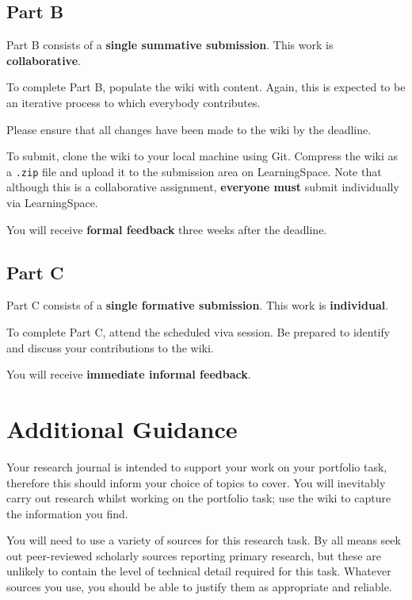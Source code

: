 \documentclass{../../fal_assignment}
\begin{document}
\subsection*{Part B}

Part B consists of a \textbf{single summative submission}. This work is \textbf{collaborative}.

To complete Part B, populate the wiki with content.
Again, this is expected to be an iterative process to which everybody contributes.

Please ensure that all changes have been made to the wiki by the deadline.

To submit, clone the wiki to your local machine using Git.
Compress the wiki as a \texttt{.zip} file and upload it to the submission area on LearningSpace.
Note that although this is a collaborative assignment,
\textbf{everyone must} submit individually via LearningSpace.

You will receive \textbf{formal feedback} three weeks after the deadline.

\subsection*{Part C}

Part C consists of a \textbf{single formative submission}. This work is \textbf{individual}.

To complete Part C, attend the scheduled viva session.
Be prepared to identify and discuss your contributions to the wiki.

You will receive \textbf{immediate informal feedback}.

\section*{Additional Guidance}

Your research journal is intended to support your work on your portfolio task,
therefore this should inform your choice of topics to cover.
You will inevitably carry out research whilst working on the portfolio task;
use the wiki to capture the information you find.

You will need to use a variety of sources for this research task.
By all means seek out peer-reviewed scholarly sources reporting primary research,
but these are unlikely to contain the level of technical detail required for this task.
Whatever sources you use, you should be able to justify them as appropriate and reliable.
\end{document}
